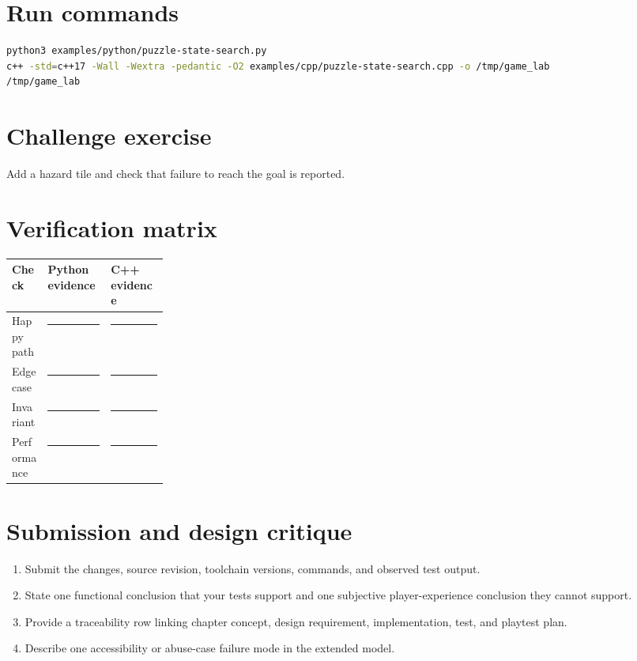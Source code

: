 \documentclass[11pt]{article}
\begin{document}
\section{Run commands}
\begin{lstlisting}[language=bash]
python3 examples/python/puzzle-state-search.py
c++ -std=c++17 -Wall -Wextra -pedantic -O2 examples/cpp/puzzle-state-search.cpp -o /tmp/game_lab
/tmp/game_lab
\end{lstlisting}

\section{Challenge exercise}
Add a hazard tile and check that failure to reach the goal is reported.


\section{Verification matrix}
\begin{tabularx}{\linewidth}{@{}p{0.23\linewidth}X X@{}}\toprule Check & Python evidence & C++ evidence\\\midrule
Happy path & \rule{0.85\linewidth}{0.4pt} & \rule{0.85\linewidth}{0.4pt}\\[0.35cm]
Edge case & \rule{0.85\linewidth}{0.4pt} & \rule{0.85\linewidth}{0.4pt}\\[0.35cm]
Invariant & \rule{0.85\linewidth}{0.4pt} & \rule{0.85\linewidth}{0.4pt}\\[0.35cm]
Performance & \rule{0.85\linewidth}{0.4pt} & \rule{0.85\linewidth}{0.4pt}\\\bottomrule\end{tabularx}

\section{Submission and design critique}
\begin{enumerate}
\item Submit the changes, source revision, toolchain versions, commands, and observed test output.
\item State one functional conclusion that your tests support and one subjective player-experience conclusion they cannot support.
\item Provide a traceability row linking chapter concept, design requirement, implementation, test, and playtest plan.
\item Describe one accessibility or abuse-case failure mode in the extended model.
\end{enumerate}
\end{document}
